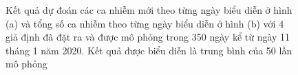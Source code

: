 \documentclass[../main.tex]{subfiles}
\begin{document}
\begin{figure}[ht]
    \centering
    \caption{Kết quả dự đoán các ca nhiễm mới theo từng ngày biểu diễn ở hình (a) và tổng số ca nhiễm theo từng ngày biểu diễn ở hình (b) với 4 giả định đã đặt ra và được mô phỏng trong 350 ngày kể từ ngày 11 tháng 1 năm 2020. Kết quả được biểu diễn là trung bình của 50 lần mô phỏng}
    \label{fig:6}
\end{figure}
\end{document}
